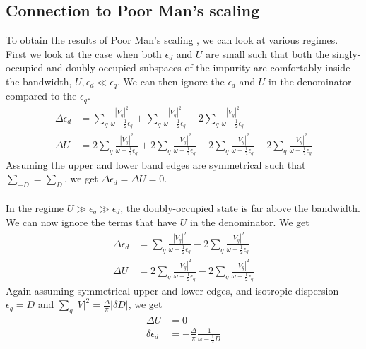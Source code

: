 \documentclass[twoside,11pt]{report}
\numberwithin{equation}{section}
\begin{document}
\subsection{Connection to Poor Man's scaling}\label{urg2pms}
To obtain the results of Poor Man's scaling \cite{haldane}\cite{Jefferson},  we can look at various regimes. First we look at the case when both \(\epsilon_d\) and \(U\) are small such that both the singly-occupied and doubly-occupied subspaces of the impurity are comfortably inside the bandwidth, \(U,\epsilon_d \ll \epsilon_q\). We can then ignore the \(\epsilon_d\) and \(U\) in the denominator compared to the \(\epsilon_q\).
\begin{equation}\begin{aligned}
\Delta \epsilon_d &= \sum_{q}\frac{|V_q|^2}{\omega - \frac{1}{2}\epsilon_q} + \sum_{q}\frac{|V_q|^2}{\omega - \frac{1}{2}\epsilon_q} - 2\sum_{q}\frac{|V_q|^2}{\omega - \frac{1}{2}\epsilon_q}\\
\Delta U &= 2\sum_{q}\frac{|V_q|^2}{\omega - \frac{1}{2}\epsilon_q} + 2\sum_{q}\frac{|V_q|^2}{\omega - \frac{1}{2}\epsilon_q} - 2\sum_{q}\frac{|V_q|^2}{\omega - \frac{1}{2}\epsilon_q} - 2\sum_{q}\frac{|V_q|^2}{\omega - \frac{1}{2}\epsilon_q}
\end{aligned}\end{equation}
Assuming the upper and lower band edges are symmetrical such that \(\sum_{-D} = \sum_D\), we get \(\Delta \epsilon_d = \Delta U = 0\). 
\\\\In the regime \(U \gg \epsilon_q \gg \epsilon_d\), the doubly-occupied state is far above the bandwidth. We can now ignore the terms that have \(U\) in the denominator. We get
\begin{equation}\begin{aligned}
\Delta \epsilon_d &= \sum_{q}\frac{|V_q|^2}{\omega - \frac{1}{2}\epsilon_q} - 2\sum_{q}\frac{|V_q|^2}{\omega - \frac{1}{2}\epsilon_q}\\
\Delta U &= 2\sum_{q}\frac{|V_q|^2}{\omega - \frac{1}{2}\epsilon_q}  - 2\sum_{q}\frac{|V_q|^2}{\omega - \frac{1}{2}\epsilon_q} 
\end{aligned}\end{equation}
Again assuming symmetrical upper and lower edges, and isotropic dispersion \(\epsilon_q=D\) and \(\sum_q |V|^2 = \frac{\Delta}{\pi}|\delta D|\), we get
\begin{equation}\begin{aligned}
\Delta U &= 0\\
\delta \epsilon_d &= -\frac{\Delta}{\pi}\frac{1}{\omega - \frac{1}{2} D}
\end{aligned}\end{equation}
\end{document}
